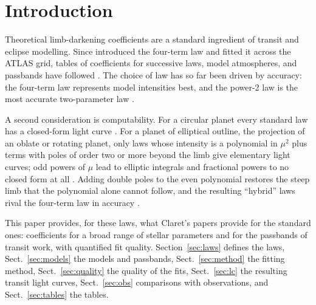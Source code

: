 \documentclass{aa}
\begin{document}

\maketitle

\section{Introduction}
Theoretical limb-darkening coefficients are a standard ingredient of transit
and eclipse modelling. Since \citet{claret2000} introduced the four-term law and
fitted it across the ATLAS grid, tables of coefficients for successive laws,
model atmospheres, and passbands have followed
\citep{claretbloemen2011,claret2012,claret2013,claret2017,claret2018,claretsouthworth2022,claretsouthworth2023,claret2025}.
The choice of law has so far been driven by accuracy: the four-term law
represents model intensities best, and the power-2 law \citep{hestroffer1997}
is the most accurate two-parameter law \citep{maxted2018,claretsouthworth2022}.

A second consideration is computability. For a circular planet every standard
law has a closed-form light curve \citep{mandelagol2002,agol2020}. For a planet
of elliptical outline, the projection of an oblate or rotating planet, only laws
whose intensity is a polynomial in $\mu^2$ plus terms with poles of order two or
more beyond the limb give elementary light curves; odd powers of $\mu$ lead to
elliptic integrals and fractional powers to no closed form at all
\citep{squishier}. Adding double poles to the even polynomial restores the steep
limb that the polynomial alone cannot follow, and the resulting ``hybrid'' laws
rival the four-term law in accuracy \citep{squishier}.

This paper provides, for these laws, what Claret's papers provide for the
standard ones: coefficients for a broad range of stellar parameters and for the
passbands of transit work, with quantified fit quality. Section~\ref{sec:laws}
defines the laws, Sect.~\ref{sec:models} the models and passbands,
Sect.~\ref{sec:method} the fitting method, Sect.~\ref{sec:quality} the quality
of the fits, Sect.~\ref{sec:lc} the resulting transit light curves,
Sect.~\ref{sec:obs} comparisons with observations, and
Sect.~\ref{sec:tables} the tables.
\end{document}
